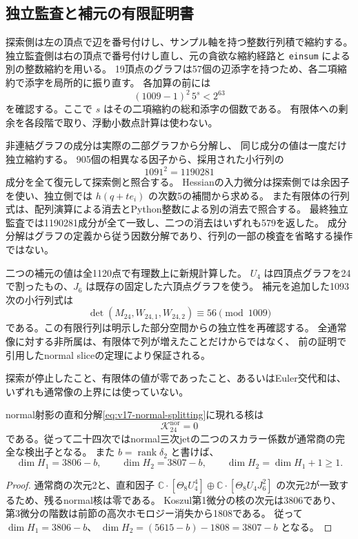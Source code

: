 \subsection{独立監査と補元の有限証明書}

探索側は左の頂点で辺を番号付けし、サンプル軸を持つ整数行列積で縮約する。
独立監査側は右の頂点で番号付けし直し、元の貪欲な縮約経路と
\texttt{einsum} による別の整数縮約を用いる。
19頂点のグラフは57個の辺添字を持つため、各二項縮約で添字を局所的に振り直す。
各加算の前には
\[
 (1009-1)^2\,5^s<2^{63}
\]
を確認する。ここで $s$ はその二項縮約の総和添字の個数である。
有限体への剰余を各段階で取り、浮動小数点計算は使わない。

非連結グラフの成分は実際の二部グラフから分解し、
同じ成分の値は一度だけ独立縮約する。
905個の相異なる因子から、採用された小行列の
\[
 1091^2=1190281
\]
成分を全て復元して探索側と照合する。
Hessianの入力微分は探索側では余因子を使い、独立側では
$h(q+te_i)$ の次数5の補間から求める。
また有限体の行列式は、配列演算による消去とPython整数による別の消去で照合する。
最終独立監査では1190281成分が全て一致し、二つの消去はいずれも579を返した。
成分分解はグラフの定義から従う因数分解であり、行列の一部の検査を省略する操作ではない。

二つの補元の値は全1120点で有理数上に新規計算した。
$U_4$ は四頂点グラフを24で割ったもの、$J_6$ は既存の固定した六頂点グラフを使う。
補元を追加した1093次の小行列式は
\[
 \det(M_{24},W_{24,1},W_{24,2})\equiv56\pmod{1009}
\]
である。この有限行列は明示した部分空間からの独立性を再確認する。
全通常像に対する非所属は、有限体で列が増えたことだけからではなく、
前の証明で引用したnormal sliceの定理により保証される。

探索が停止したこと、有限体の値が零であったこと、あるいはEuler交代和は、
いずれも通常像の上界には使っていない。

\begin{corollary}[二十四次のnormal核とKoszulホモロジー]
\label{cor:v17-rank24-normal-koszul}
normal射影の直和分解\eqref{eq:v17-normal-splitting}に現れる核は
\[
 \mathcal K_{24}^{\mathrm{nor}}=0
\]
である。従って二十四次ではnormal三次jetの二つのスカラー係数が通常商の完全な検出子となる。
また $b=\operatorname{rank}\delta_2$ と書けば、
\[
 \dim H_1=3806-b,\qquad
 \dim H_2=3807-b,\qquad
 \dim H_2=\dim H_1+1\ge1.
\]
\end{corollary}

\begin{proof}
通常商の次元2と、直和因子
$\mathbb C\cdot[\Theta_8U_4^4]\oplus\mathbb C\cdot[\Theta_8U_4J_6^2]$
の次元2が一致するため、残るnormal核は零である。
Koszul第1微分の核の次元は3806であり、
第3微分の階数は前節の高次ホモロジー消失から1808である。
従って $\dim H_1=3806-b$、
$\dim H_2=(5615-b)-1808=3807-b$ となる。
\end{proof}

